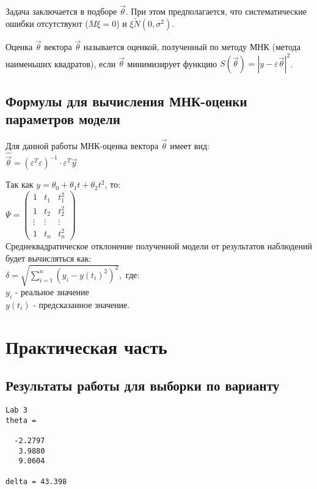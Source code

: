 Задача заключается в подборе $\overrightarrow{\theta}$. При этом предполагается, что систематические ошибки отсутствуют ($M\xi = 0$) и $\xi \tilde N(0, \sigma^2)$.

Оценка $\overrightarrow{\theta}$ вектора $\overrightarrow\theta$ называется оценкой, полученный по методу МНК (метода наименьших квадратов), если $\overrightarrow\theta$ минимизирует функцию $S(\overrightarrow\theta)=|y - \varepsilon \overrightarrow\theta|^2$.

\section{Формулы для вычисления МНК-оценки параметров модели}

Для данной работы МНК-оценка вектора $\vec\theta$ имеет вид:\\
$\hat\vec\theta = (\varepsilon^T \varepsilon)^{-1} \cdot \varepsilon^T \vec{y}$

Так как $y = \theta_0 + \theta_1 t + \theta_2 t^2$, то:\\

$
    \Psi = \begin{pmatrix}
        1      & t_1    & t_1^2  \\
        1      & t_2    & t_2^2  \\
        \vdots & \vdots & \vdots \\
        1      & t_n    & t_n^2
    \end{pmatrix}
$\\

Среднеквадратическое отклонение полученной модели от результатов наблюдений будет вычисляться как:\\
$\delta = \sqrt{\sum\limits^n_{i=1}(y_i - y(t_i)^2)^2},$ где:\\
$y_i$ - реальное значение\\
$y(t_i)$ - предсказанное значение.

\chapter{Практическая часть}

\section{Результаты работы для выборки по варианту}
\begin{lstlisting}
Lab 3
theta =

  -2.2797
   3.9880
   9.0604

delta = 43.398
\end{lstlisting}

